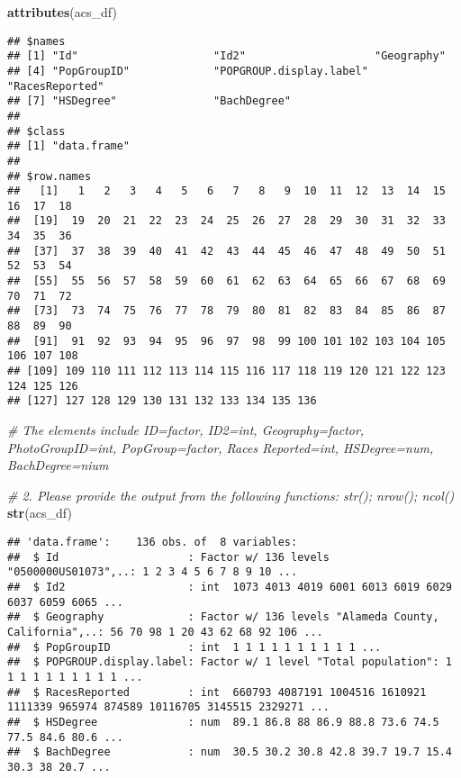 \documentclass[
]{article}
\newenvironment{Shaded}{\begin{snugshade}}{\end{snugshade}}
\newcommand{\CommentTok}[1]{\textcolor[rgb]{0.56,0.35,0.01}{\textit{#1}}}
\newcommand{\KeywordTok}[1]{\textcolor[rgb]{0.13,0.29,0.53}{\textbf{#1}}}
\newcommand{\NormalTok}[1]{#1}
\begin{document}
\begin{Shaded}
\begin{Highlighting}[]
\KeywordTok{attributes}\NormalTok{(acs_df)}
\end{Highlighting}
\end{Shaded}

\begin{verbatim}
## $names
## [1] "Id"                     "Id2"                    "Geography"             
## [4] "PopGroupID"             "POPGROUP.display.label" "RacesReported"         
## [7] "HSDegree"               "BachDegree"            
## 
## $class
## [1] "data.frame"
## 
## $row.names
##   [1]   1   2   3   4   5   6   7   8   9  10  11  12  13  14  15  16  17  18
##  [19]  19  20  21  22  23  24  25  26  27  28  29  30  31  32  33  34  35  36
##  [37]  37  38  39  40  41  42  43  44  45  46  47  48  49  50  51  52  53  54
##  [55]  55  56  57  58  59  60  61  62  63  64  65  66  67  68  69  70  71  72
##  [73]  73  74  75  76  77  78  79  80  81  82  83  84  85  86  87  88  89  90
##  [91]  91  92  93  94  95  96  97  98  99 100 101 102 103 104 105 106 107 108
## [109] 109 110 111 112 113 114 115 116 117 118 119 120 121 122 123 124 125 126
## [127] 127 128 129 130 131 132 133 134 135 136
\end{verbatim}

\begin{Shaded}
\begin{Highlighting}[]
\CommentTok{# The elements include ID=factor, ID2=int, Geography=factor, PhotoGroupID=int, PopGroup=factor, Races Reported=int, HSDegree=num, BachDegree=nium}

\CommentTok{# 2. Please provide the output from the following functions: str(); nrow(); ncol()}
\KeywordTok{str}\NormalTok{(acs_df)}
\end{Highlighting}
\end{Shaded}

\begin{verbatim}
## 'data.frame':    136 obs. of  8 variables:
##  $ Id                    : Factor w/ 136 levels "0500000US01073",..: 1 2 3 4 5 6 7 8 9 10 ...
##  $ Id2                   : int  1073 4013 4019 6001 6013 6019 6029 6037 6059 6065 ...
##  $ Geography             : Factor w/ 136 levels "Alameda County, California",..: 56 70 98 1 20 43 62 68 92 106 ...
##  $ PopGroupID            : int  1 1 1 1 1 1 1 1 1 1 ...
##  $ POPGROUP.display.label: Factor w/ 1 level "Total population": 1 1 1 1 1 1 1 1 1 1 ...
##  $ RacesReported         : int  660793 4087191 1004516 1610921 1111339 965974 874589 10116705 3145515 2329271 ...
##  $ HSDegree              : num  89.1 86.8 88 86.9 88.8 73.6 74.5 77.5 84.6 80.6 ...
##  $ BachDegree            : num  30.5 30.2 30.8 42.8 39.7 19.7 15.4 30.3 38 20.7 ...
\end{verbatim}
\end{document}
